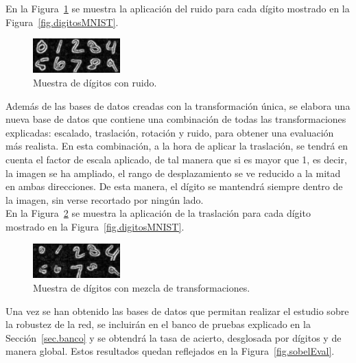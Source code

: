 \begin{description}
	En la Figura~\ref{fig.ruido} se muestra la aplicación del ruido para cada dígito mostrado en la Figura~\ref{fig.digitosMNIST}.
	\begin{figure}[H]
		\begin{center}
			\includegraphics[width=0.3\textwidth]{figures/ruido}
			\caption{Muestra de dígitos con ruido.}
			\label{fig.ruido}
		\end{center}
	\end{figure}
\end{description}

Además de las bases de datos creadas con la transformación única, se elabora una nueva base de datos que contiene una combinación de todas las transformaciones explicadas: escalado, traslación, rotación y ruido, para obtener una evaluación más realista. En esta combinación, a la hora de aplicar la traslación, se tendrá en cuenta el factor de escala aplicado, de tal manera que si es mayor que 1, es decir, la imagen se ha ampliado, el rango de desplazamiento se ve reducido a la mitad en ambas direcciones. De esta manera, el dígito se mantendrá siempre dentro de la imagen, sin verse recortado por ningún lado.\\

En la Figura~\ref{fig.mix} se muestra la aplicación de la traslación para cada dígito mostrado en la Figura~\ref{fig.digitosMNIST}.
\begin{figure}[H]
	\begin{center}
		\includegraphics[width=0.3\textwidth]{figures/mix}
		\caption{Muestra de dígitos con mezcla de transformaciones.}
		\label{fig.mix}
	\end{center}
\end{figure}

Una vez se han obtenido las bases de datos que permitan realizar el estudio sobre la robustez de la red, se incluirán en el banco de pruebas explicado en la Sección~\ref{sec.banco} y se obtendrá la tasa de acierto, desglosada por dígitos y de manera global. Estos resultados quedan reflejados en la Figura~\ref{fig.sobelEval}.

